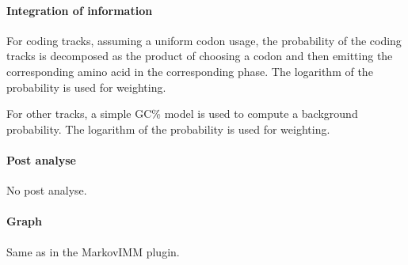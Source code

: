 \paragraph{Integration of information}

For coding tracks, assuming a uniform codon usage, the probability of
the coding tracks is decomposed as the product of choosing a codon and
then emitting the corresponding amino acid in the corresponding
phase. The logarithm of the probability is used for weighting.

For other tracks, a simple GC\% model is used to compute a background
probability. The logarithm of the probability is used for weighting.

\paragraph{Post analyse}

No post analyse.

\paragraph{Graph}

Same as in the MarkovIMM plugin.  



